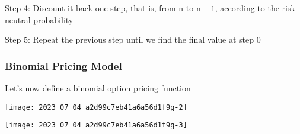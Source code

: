 \documentclass[10pt]{article}
\begin{document}
Step 4: Discount it back one step, that is, from $\mathrm{n}$ to $\mathrm{n}-1$, according to the risk neutral probability

Step 5: Repeat the previous step until we find the final value at step 0

\subsubsection*{Binomial Pricing Model}
Let's now define a binomial option pricing function

\begin{center}
\texttt{[image: 2023\_07\_04\_a2d99c7eb41a6a56d1f9g-2]}
\end{center}

\begin{center}
\texttt{[image: 2023\_07\_04\_a2d99c7eb41a6a56d1f9g-3]}
\end{center}
\end{document}
